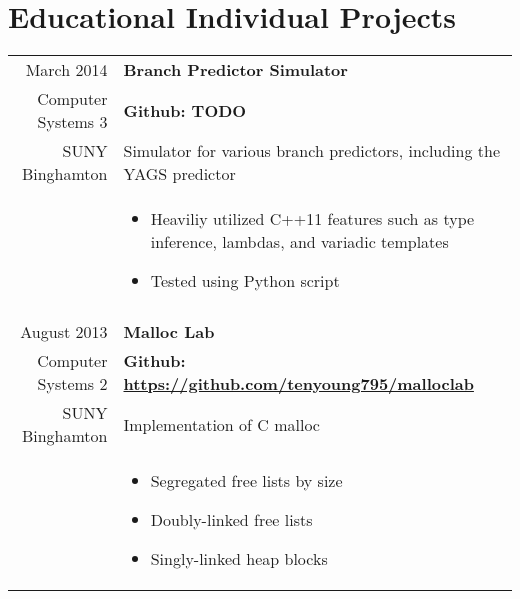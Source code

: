 \documentclass[letterpaper,10pt]{article} %
\begin{document}
\section{Educational Individual Projects}

\begin{longtable}{r|p{4.5in}}

    March 2014 & \textbf{Branch Predictor Simulator} \\
    Computer Systems 3 & \textbf{Github: TODO} \\
    SUNY Binghamton & Simulator for various branch predictors, including the YAGS predictor \\
    & \begin{itemize}
        \item Heaviliy utilized C++11 features such as type inference, lambdas, and variadic templates
        \item Tested using Python script
    \end{itemize} \\

    \multicolumn{2}{c}{} \\

    August 2013 & \textbf{Malloc Lab} \\
    Computer Systems 2 & \textbf{Github: \url{https://github.com/tenyoung795/malloclab}} \\
    SUNY Binghamton & Implementation of C malloc \\
    & \begin{itemize}
        \item Segregated free lists by size
        \item Doubly-linked free lists
        \item Singly-linked heap blocks
    \end{itemize}
\end{longtable}
\end{document}

